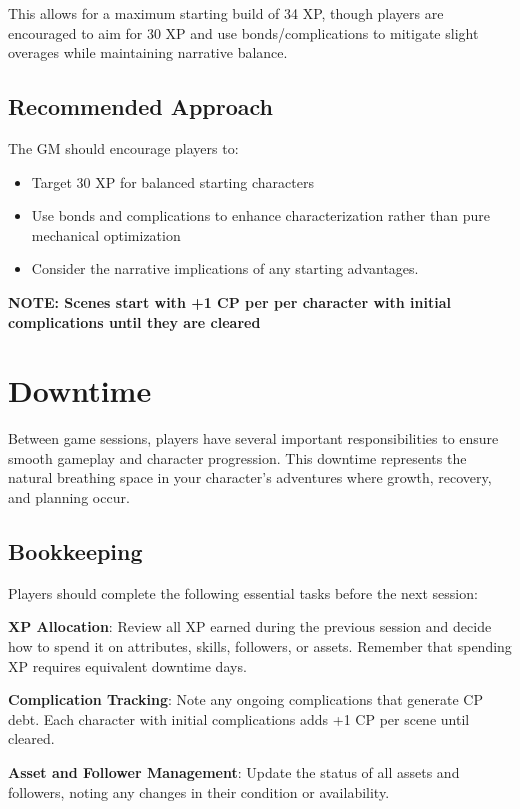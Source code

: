 This allows for a maximum starting build of 34 XP, though players are encouraged to aim for 30 XP and use bonds/complications to mitigate slight overages while maintaining narrative balance.

\subsection{Recommended Approach}

The GM should encourage players to:
\begin{itemize}
    \item Target 30 XP for balanced starting characters
    \item Use bonds and complications to enhance characterization rather than pure mechanical optimization
    \item Consider the narrative implications of any starting advantages.
\end{itemize}
\textbf{NOTE: Scenes start with +1 CP per per character with initial complications until they are cleared}

\section{Downtime}

Between game sessions, players have several important responsibilities to ensure smooth gameplay and character progression. This downtime represents the natural breathing space in your character's adventures where growth, recovery, and planning occur.

\subsection{Bookkeeping}

Players should complete the following essential tasks before the next session:

\textbf{XP Allocation}: Review all XP earned during the previous session and decide how to spend it on attributes, skills, followers, or assets. Remember that spending XP requires equivalent downtime days.

\textbf{Complication Tracking}: Note any ongoing complications that generate CP debt. Each character with initial complications adds +1 CP per scene until cleared.

\textbf{Asset and Follower Management}: Update the status of all assets and followers, noting any changes in their condition or availability.

